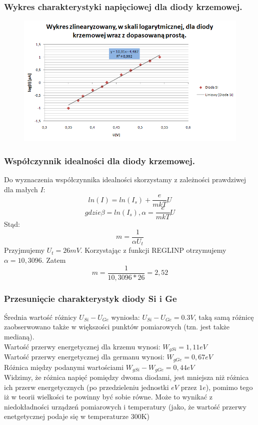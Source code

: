 \documentclass[11pt]{article}
\begin{document}
\subsubsection{Wykres charakterystyki napięciowej dla diody krzemowej. }


\begin{figure}[H]
    \centering
    \includegraphics[height=0.27\paperheight]{graph2}
    \label{fig:graph2}
\end{figure}

\subsubsection{Współczynnik idealności dla diody krzemowej. }
Do wyznaczenia współczynnika idealności skorzystamy z zależności prawdziwej dla małych $I$:
$$ ln(I) = ln(I_s) + \frac{e}{mkT}U $$
$$ gdzie \beta =  ln(I_s), \alpha =  \frac{e}{mkT}U $$
Stąd:
$$ m = \frac{1}{\alpha U_t} $$
Przyjmujemy $ U_t = 26mV $.
Korzystając z funkcji REGLINP otrzymujemy $ \alpha = 10,3096$.
Zatem
$$ m = \frac{1}{10,3096*26} =  2,52 $$


\subsubsection{Przesunięcie charakterystyk diody Si i Ge}
Średnia wartość różnicy $U_{Si} - U_{Ge}$ wyniosła: $U_{Si} - U_{Ge} = 0.3V$, taką samą różnicę zaobserwowano także w większości punktów pomiarowych (tzn. jest także medianą).\\
\newline
Wartość przerwy energetycznej dla krzemu wynosi: $W_{gSi} = 1,11eV$\\
Wartość przerwy energetycznej dla germanu wynosi: $W_{gGe} = 0,67eV$\\
Różnica między podanymi wartościami $W_{gSi} - W_{gGe} = 0,44eV$\\
\newline
Widzimy, że różnica napięć pomiędzy dwoma diodami, jest mniejsza niż różnica ich przerw energetycznych (po przedzieleniu jednostki $eV$ przez $1e$), pomimo tego iż w teorii wielkości te powinny być sobie równe. Może to wynikać z niedokładności urządzeń pomiarowych i temperatury (jako, że wartość przerwy enetgetycznej podaje się w temperaturze 300K) 
\end{document}
